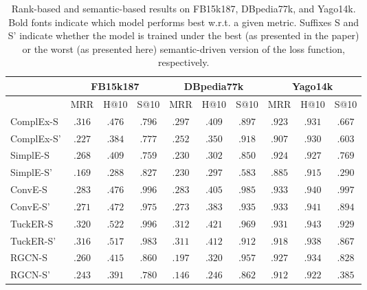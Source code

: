 \documentclass[letterpaper]{article} %
\begin{document}
\begin{table*}[h]
        \caption{Rank-based and semantic-based results on FB15k187, DBpedia77k, and Yago14k. Bold fonts indicate which model performs best w.r.t. a given metric. Suffixes S and S' indicate whether the model is trained under the best (as presented in the paper) or the worst (as presented here) semantic-driven version of the loss function, respectively.}
	\label{tab:epsilon-alpha}
	\small
        \centering
                \setlength{\tabcolsep}{0.25cm}
			\begin{tabular}{lccccccccc}
                    \hline
				&\multicolumn{3}{c}{FB15k187} & \multicolumn{3}{c}{DBpedia77k} & \multicolumn{3}{c}{Yago14k} 
                \\\hline
                    & MRR & H@10 & S@10 &
                    MRR & H@10 & S@10 &
                    MRR & H@10 & S@10 \\
				\hline
    		  ComplEx-S &
    $\mathbf{.316}$&$\mathbf{.476}$&$\mathbf{.796}$& $\mathbf{.297}$&$\mathbf{.409}$&$\mathbf{.897}$& $\mathbf{.923}$&$\mathbf{.931}$&$\mathbf{.667}$ \\
    ComplEx-S' &
    $.227$&$.384$&$.777$& $.252$&$.350$&$.918$& $.907$&$.930$&$.603$ \\
    \hline
                SimplE-S &
    $\mathbf{.268}$&$\mathbf{.409}$&$.759$& $.230$&$\mathbf{.302}$&$\mathbf{.850}$& $\mathbf{.924}$&$\mathbf{.927}$&$\mathbf{.769}$ \\
    SimplE-S' &
    $.169$&$.288$&$\mathbf{.827}$& $.230$&$.297$&$.583$& $.885$&$.915$&$.290$ \\
    \hline
			ConvE-S &
    $\mathbf{.283}$&$\mathbf{.476}$&$\mathbf{.996}$& $\mathbf{.283}$&$\mathbf{.405}$&$\mathbf{.985}$& $.933$&$.940$&$\mathbf{.997}$  \\
    ConvE-S' &
    $.271$&$.472$&$.975$& $.273$&$.383$&$.935$& $.933$&$\mathbf{.941}$&$.894$  \\
    \hline
    		TuckER-S &
    $\mathbf{.320}$&$\mathbf{.522}$&$\mathbf{.996}$& $\mathbf{.312}$&$\mathbf{.421}$&$\mathbf{.969}$& $\mathbf{.931}$&$\mathbf{.943}$&$\mathbf{.929}$ \\
    TuckER-S' &
    $.316$&$.517$&$.983$& $.311$&$.412$&$.912$& $.918$&$.938$&$.867$ \\
    \hline
                RGCN-S &
    $\mathbf{.260}$&$\mathbf{.415}$&$\mathbf{.860}$& $\mathbf{.197}$&$\mathbf{.320}$&$\mathbf{.957}$& $\mathbf{.927}$&$\mathbf{.934}$&$\mathbf{.828}$ \\
    RGCN-S' &
    $.243$&$.391$&$.780$& $.146$&$.246$&$.862$& $.912$&$.922$&$.385$ \\
    \hline
			\end{tabular}
 \end{table*}
\end{document}
